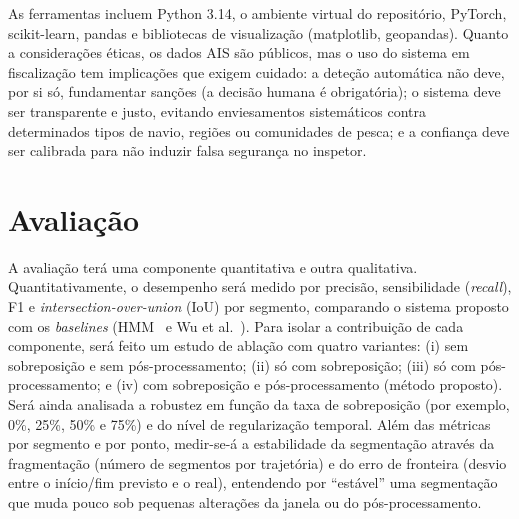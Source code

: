 \documentclass{article}
\begin{document}
As ferramentas incluem Python 3.14, o ambiente virtual do reposit\'orio, PyTorch,
scikit-learn, pandas e bibliotecas de visualiza\c{c}\~ao (matplotlib, geopandas). Quanto a
considera\c{c}\~oes \'eticas, os dados AIS s\~ao p\'ublicos, mas o uso do sistema em
fiscaliza\c{c}\~ao tem implica\c{c}\~oes que exigem cuidado: a dete\c{c}\~ao autom\'atica
n\~ao deve, por si s\'o, fundamentar san\c{c}\~oes (a decis\~ao humana \'e
obrigat\'oria); o sistema deve ser transparente e justo, evitando enviesamentos
sistem\'aticos contra determinados tipos de navio, regi\~oes ou comunidades de pesca; e a
confian\c{c}a deve ser calibrada para n\~ao induzir falsa seguran\c{c}a no inspetor.

\section{Avalia\c{c}\~ao}
\label{sec:avaliacao}

A avalia\c{c}\~ao ter\'a uma componente quantitativa e outra qualitativa.
Quantitativamente, o desempenho ser\'a medido por precis\~ao, sensibilidade (\emph{recall}),
F1 e \emph{intersection-over-union} (IoU) por segmento, comparando o sistema proposto com
os \emph{baselines} (HMM~\cite{peel2011} e Wu et al.~\cite{wu2022}). Para isolar a contribui\c{c}\~ao de cada
componente, ser\'a feito um estudo de abla\c{c}\~ao com quatro variantes: (i) sem
sobreposi\c{c}\~ao e sem p\'os-processamento; (ii) s\'o com sobreposi\c{c}\~ao; (iii) s\'o com
p\'os-processamento; e (iv) com sobreposi\c{c}\~ao e p\'os-processamento (m\'etodo proposto).
Ser\'a ainda analisada a robustez em fun\c{c}\~ao da taxa de sobreposi\c{c}\~ao (por exemplo,
0\%, 25\%, 50\% e 75\%) e do n\'ivel de regulariza\c{c}\~ao temporal. Al\'em das m\'etricas por
segmento e por ponto, medir-se-\'a a estabilidade da segmenta\c{c}\~ao atrav\'es da
fragmenta\c{c}\~ao (n\'umero de segmentos por trajet\'oria) e do erro de fronteira (desvio entre
o in\'icio/fim previsto e o real), entendendo por ``est\'avel'' uma segmenta\c{c}\~ao que muda
pouco sob pequenas altera\c{c}\~oes da janela ou do p\'os-processamento.
\end{document}
